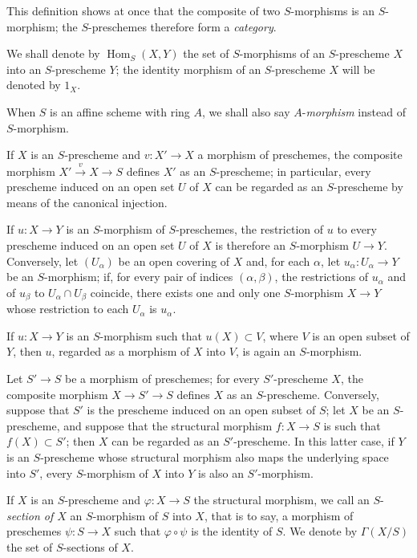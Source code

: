 This definition shows at once that the composite of two $S$-morphisms is an
$S$-morphism; the $S$-preschemes therefore form a \emph{category}.

We shall denote by $\operatorname{Hom}_S(X,Y)$ the set of $S$-morphisms of
an $S$-prescheme $X$ into an $S$-prescheme $Y$; the identity morphism of an
$S$-prescheme $X$ will be denoted by $1_X$.

When $S$ is an affine scheme with ring $A$, we shall also say
$A$-\emph{morphism} instead of $S$-morphism.

\begin{env}[2.5.3]
\label{I.2.5.3}
If $X$ is an $S$-prescheme and $v:X'\to X$ a morphism of preschemes, the
composite morphism $X'\xrightarrow{v}X\to S$ defines $X'$ as an
$S$-prescheme; in particular, every prescheme induced on an open set $U$ of
$X$ can be regarded as an $S$-prescheme by means of the canonical
injection.

If $u:X\to Y$ is an $S$-morphism of $S$-preschemes, the restriction of $u$
to every prescheme induced on an open set $U$ of $X$ is therefore an
$S$-morphism $U\to Y$. Conversely, let $(U_\alpha)$ be an open covering of
$X$ and, for each $\alpha$, let $u_\alpha:U_\alpha\to Y$ be an $S$-morphism;
if, for every pair of indices $(\alpha,\beta)$, the restrictions of
$u_\alpha$ and of $u_\beta$ to $U_\alpha\cap U_\beta$ coincide, there exists
one and only one $S$-morphism $X\to Y$ whose restriction to each $U_\alpha$
is $u_\alpha$.

If $u:X\to Y$ is an $S$-morphism such that $u(X)\subset V$, where $V$ is an
open subset of $Y$, then $u$, regarded as a morphism of $X$ into $V$, is
again an $S$-morphism.
\end{env}

\begin{env}[2.5.4]
\label{I.2.5.4}
Let $S'\to S$ be a morphism of preschemes; for every $S'$-prescheme $X$, the
composite morphism $X\to S'\to S$ defines $X$ as an $S$-prescheme.
Conversely, suppose that $S'$ is the prescheme induced on an open subset of
$S$; let $X$ be an $S$-prescheme, and suppose that the structural morphism
$f:X\to S$ is such that $f(X)\subset S'$; then $X$ can be regarded as an
$S'$-prescheme. In this latter case, if $Y$ is an $S$-prescheme whose
structural morphism also maps the underlying space into $S'$, every
$S$-morphism of $X$ into $Y$ is also an $S'$-morphism.
\end{env}

\begin{env}[2.5.5]
\label{I.2.5.5}
If $X$ is an $S$-prescheme and $\varphi:X\to S$ the structural morphism, we
call an $S$-\emph{section of $X$} an $S$-morphism of $S$ into $X$, that is
to say, a morphism of preschemes $\psi:S\to X$ such that
$\varphi\circ\psi$ is the identity of $S$. We denote by $\Gamma(X/S)$
the set of $S$-sections of $X$.
\end{env}

